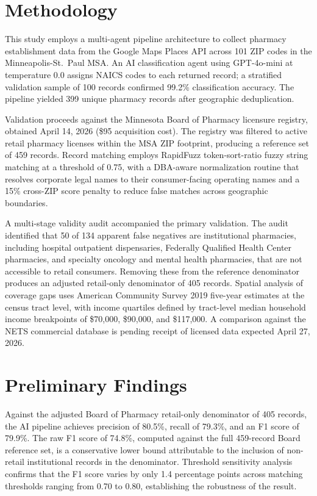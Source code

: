 \documentclass[12pt]{article}
\begin{document}
\section{Methodology}

This study employs a multi-agent pipeline architecture to collect pharmacy establishment data from the Google Maps Places API across 101 ZIP codes in the Minneapolis-St.\ Paul MSA. An AI classification agent using GPT-4o-mini at temperature 0.0 assigns NAICS codes to each returned record; a stratified validation sample of 100 records confirmed 99.2\% classification accuracy. The pipeline yielded 399 unique pharmacy records after geographic deduplication.

Validation proceeds against the Minnesota Board of Pharmacy licensure registry, obtained April 14, 2026 (\$95 acquisition cost). The registry was filtered to active retail pharmacy licenses within the MSA ZIP footprint, producing a reference set of 459 records. Record matching employs RapidFuzz token-sort-ratio fuzzy string matching at a threshold of 0.75, with a DBA-aware normalization routine that resolves corporate legal names to their consumer-facing operating names and a 15\% cross-ZIP score penalty to reduce false matches across geographic boundaries.

A multi-stage validity audit accompanied the primary validation. The audit identified that 50 of 134 apparent false negatives are institutional pharmacies, including hospital outpatient dispensaries, Federally Qualified Health Center pharmacies, and specialty oncology and mental health pharmacies, that are not accessible to retail consumers. Removing these from the reference denominator produces an adjusted retail-only denominator of 405 records. Spatial analysis of coverage gaps uses American Community Survey 2019 five-year estimates at the census tract level, with income quartiles defined by tract-level median household income breakpoints of \$70,000, \$90,000, and \$117,000. A comparison against the NETS commercial database is pending receipt of licensed data expected April 27, 2026.

\section{Preliminary Findings}

Against the adjusted Board of Pharmacy retail-only denominator of 405 records, the AI pipeline achieves precision of 80.5\%, recall of 79.3\%, and an F1 score of 79.9\%. The raw F1 score of 74.8\%, computed against the full 459-record Board reference set, is a conservative lower bound attributable to the inclusion of non-retail institutional records in the denominator. Threshold sensitivity analysis confirms that the F1 score varies by only 1.4 percentage points across matching thresholds ranging from 0.70 to 0.80, establishing the robustness of the result.
\end{document}
